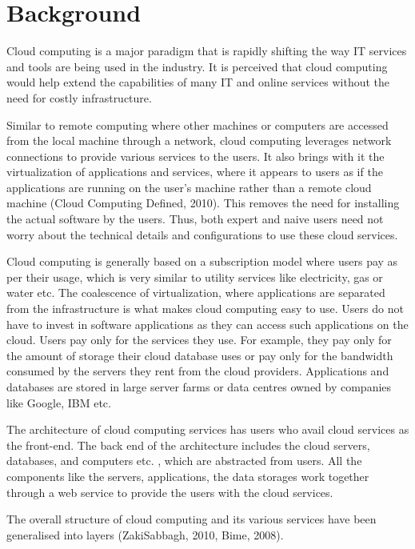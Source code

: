 \chapter{Background} \label{c:background}

Cloud computing is a major paradigm that is rapidly shifting the way \ac{IT}
services and tools are being used in the industry.  It is perceived that cloud
computing would help extend the capabilities of many \ac{IT} and online services
without the need for costly infrastructure. 

Similar to remote computing where other machines or computers are accessed from
the local machine through a network,   cloud computing leverages network
connections to provide various services to the users.  It also brings with it the
virtualization of applications and services,   where it appears to users as if the
applications are running on the user's machine rather than a remote cloud
machine (Cloud Computing Defined,   2010).  This removes the need for installing
the actual software by the users.  Thus,   both expert and naive users need not
worry about the technical details and configurations to use these cloud
services. 

Cloud computing is generally based on a subscription model where users pay as
per their usage,   which is very similar to utility services like electricity,   gas
or water etc.  The coalescence of virtualization,   where applications are
separated from the infrastructure is what makes cloud computing easy to use. 
Users do not have to invest in software applications as they can access such
applications on the cloud.  Users pay only for the services they use.  For
example,   they pay only for the amount of storage their cloud database uses or
pay only for the bandwidth consumed by the servers they rent from the cloud
providers.  Applications and databases are stored in large server farms or data
centres owned by companies like Google,  IBM etc. 

The architecture of cloud computing services has users who avail cloud services
as the front-end.  The back end of the architecture includes the cloud servers,  
databases,   and computers etc. ,   which are abstracted from users.  All the
components like the servers,   applications,   the data storages work together
through a web service to provide the users with the cloud services. 

The overall structure of cloud computing and its various services have been
generalised into layers (ZakiSabbagh,   2010,   Bime,   2008). 

